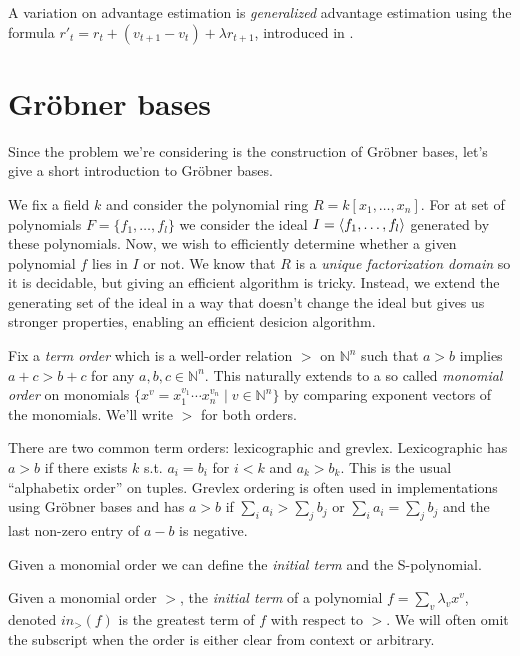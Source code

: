 \documentclass{article}
\theoremstyle{changedot}
\theoremstyle{changedotbreak}
\theoremstyle{nonumberplain}
\DeclarePairedDelimiter{\tuple}{\langle}{\rangle}
\begin{document}
A variation on advantage estimation is \emph{generalized} advantage estimation using the formula $r'_{t} = r_{t} + (v_{t+1} - v_{t}) + \lambda r_{t+1}$, introduced in \cite{GAE}.

\section{Gröbner bases}

Since the problem we're considering is the construction of Gröbner bases, let's give a short introduction to Gröbner bases.

We fix a field $k$ and consider the polynomial ring $R = k[x_{1}, \dots, x_{n}]$. For at set of polynomials $F = \{f_{1}, \dots, f_{l}\}$ we consider the ideal $I = \tuple{f_{1}, \dots, f_{l}}$ generated by these polynomials. Now, we wish to efficiently determine whether a given polynomial $f$ lies in $I$ or not. We know that $R$ is a \emph{unique factorization domain} so it is decidable, but giving an efficient algorithm is tricky. Instead, we extend the generating set of the ideal in a way that doesn't change the ideal but gives us stronger properties, enabling an efficient desicion algorithm.

Fix a \emph{term order} which is a well-order relation $>$ on $\mathbb N^{n}$ such that $a > b$ implies $a + c > b + c$ for any $a, b, c \in \mathbb N^{n}$. This naturally extends to a so called \emph{monomial order} on monomials $\{x^{v} = x_{1}^{v_{1}} \cdots x_{n}^{v_{n}} \mid v \in \mathbb N^{n}\}$ by comparing exponent vectors of the monomials. We'll write $>$ for both orders.

There are two common term orders: lexicographic and grevlex. Lexicographic has $a > b$ if there exists $k$ s.t. $a_{i} = b_{i}$ for $i < k$ and $a_{k} > b_{k}$. This is the usual ``alphabetix order'' on tuples. Grevlex ordering is often used in implementations using Gröbner bases and has $a > b$ if $\sum_{i} a_{i} > \sum_{j} b_{j}$ or   $\sum_{i} a_{i} = \sum_{j} b_{j}$ and the last non-zero entry of $a - b$ is negative. 

Given a monomial order we can define the \emph{initial term} and the S-polynomial.

\begin{definition}
  Given a monomial order $>$, the \emph{initial term} of a polynomial $f = \sum_{v} \lambda_{v} x^{v}$, denoted $in_{>}(f)$ is the greatest term of $f$ with respect to $>$. We will often omit the subscript when the order is either clear from context or arbitrary.
\end{definition}
\end{document}
